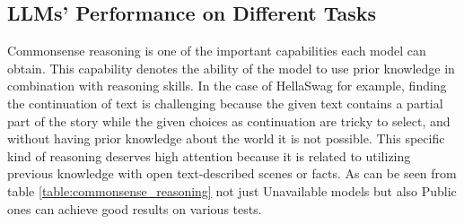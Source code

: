\documentclass[conference]{IEEEtran}
\begin{document}
\subsection{LLMs' Performance on Different Tasks}
Commonsense reasoning is one of the important capabilities each model can obtain. This capability denotes the ability of the model to use prior knowledge in combination with reasoning skills. In the case of HellaSwag for example, finding the continuation of text is challenging because the given text contains a partial part of the story while the given choices as continuation are tricky to select, and without having prior knowledge about the world it is not possible. This specific kind of reasoning deserves high attention because it is related to utilizing previous knowledge with open text-described scenes or facts. As can be seen from table \ref{table:commonsense_reasoning} not just Unavailable models but also Public ones can achieve good results on various tests.
\end{document}
